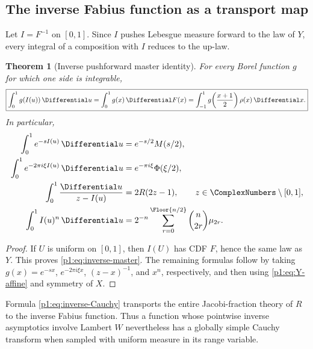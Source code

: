 \documentclass[11pt]{article}
\newtheorem{theorem}{Theorem}[section]
\theoremstyle{definition}
\theoremstyle{remark}
\begin{document}
\subsection{The inverse Fabius function as a transport map}

Let \(I=F^{-1}\) on \([0,1]\).  Since \(I\) pushes Lebesgue measure forward to the law
of \(Y\), every integral of a composition with \(I\) reduces to the up-law.

\begin{theorem}[Inverse pushforward master identity]\label{p1:thm:inverse-pushforward}
For every Borel function \(g\) for which one side is integrable,
\begin{equation}
 \boxed{
 \int_0^1g(I(u))\,\Differential u
 =\int_0^1g(x)\,\Differential F(x)
 =\int_{-1}^{1}g\!\left(\frac{x+1}{2}\right)\rho(x)\,\Differential x.
 }                                                           \label{p1:eq:inverse-master}
\end{equation}
In particular,
\begin{align}
 \int_0^1 e^{-sI(u)}\,\Differential u
 &=e^{-s/2}M(s/2),                                           \label{p1:eq:inverse-Laplace}\\
 \int_0^1 e^{-2\pi i\xi I(u)}\,\Differential u
 &=e^{-\pi i\xi}\Phi(\xi/2),                              \label{p1:eq:inverse-Fourier}\\
 \int_0^1\frac{\Differential u}{z-I(u)}
 &=2R(2z-1),\qquad z\in\ComplexNumbers\setminus[0,1],                   \label{p1:eq:inverse-Cauchy}\\
 \int_0^1I(u)^n\,\Differential u
 &=2^{-n}\sum_{r=0}^{\Floor{n/2}}
   \binom{n}{2r}\mu_{2r}.                                   \label{p1:eq:inverse-moments}
\end{align}
\end{theorem}

\begin{proof}
If \(U\) is uniform on \([0,1]\), then \(I(U)\) has CDF \(F\), hence the same law as
\(Y\).  This proves \eqref{p1:eq:inverse-master}.  The remaining formulas follow by taking
\(g(x)=e^{-sx}\), \(e^{-2\pi i\xi x}\), \((z-x)^{-1}\), and \(x^n\), respectively,
and then using \eqref{p1:eq:Y-affine} and symmetry of \(X\).
\end{proof}

\begin{remark}
Formula \eqref{p1:eq:inverse-Cauchy} transports the entire Jacobi-fraction theory of \(R\) to
the inverse Fabius function.  Thus a function whose pointwise inverse asymptotics involve
Lambert \(W\) nevertheless has a globally simple Cauchy transform when sampled with
uniform measure in its range variable.
\end{remark}
\end{document}
